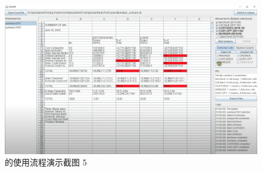 \begin{figure}[tbp]    
    \centering
    \includegraphics[width=\textwidth]{figure/sg/sguard-5.png}
    \caption{\sg 的使用流程演示截图 5}
    \label{figure-sg5}
\end{figure}